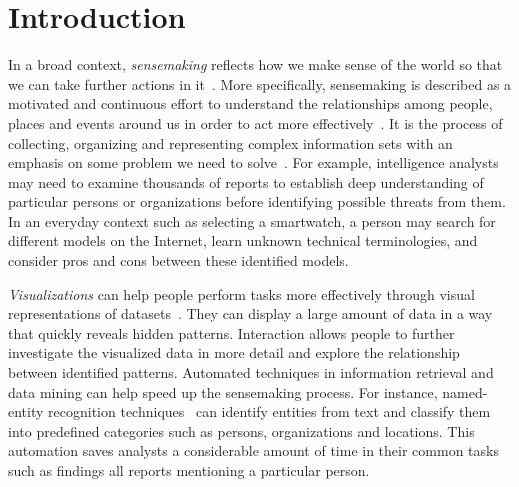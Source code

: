 \chapter{Introduction}

\graphicspath{{Chapter1/figures/}}

In a broad context, \emph{sensemaking} reflects how we make sense of the world so that we can take further actions in it~\cite{Snowden2005}. More specifically, sensemaking is described as a motivated and continuous effort to understand the relationships among people, places and events around us in order to act more effectively~\cite{Klein2006a}. It is the process of collecting, organizing and representing complex information sets with an emphasis on some problem we need to solve~\cite{Russell2008}. For example, intelligence analysts may need to examine thousands of reports to establish deep understanding of particular persons or organizations before identifying possible threats from them. In an everyday context such as selecting a smartwatch, a person may search for different models on the Internet, learn unknown technical terminologies, and consider pros and cons between these identified models. 

\emph{Visualizations} can help people perform tasks more effectively through visual representations of datasets~\cite{Munzner2014}. They can display a large amount of data in a way that quickly reveals hidden patterns. Interaction allows people to further investigate the visualized data in more detail and explore the relationship between identified patterns. Automated techniques in information retrieval and data mining can help speed up the sensemaking process. For instance, named-entity recognition techniques~\cite{Nadeau2007} can identify entities from text and classify them into predefined categories such as persons, organizations and locations. This automation saves analysts a considerable amount of time in their common tasks such as findings all reports mentioning a particular person. 

